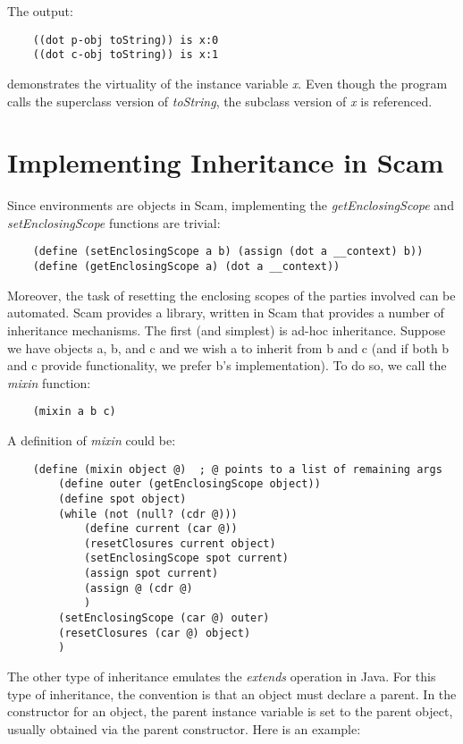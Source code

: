 The output:

\begin{verbatim}
    ((dot p-obj toString)) is x:0
    ((dot c-obj toString)) is x:1
\end{verbatim}

demonstrates the virtuality of the instance variable \emph{x}.  Even
though the program calls the superclass version of \emph{toString},
the subclass version of \emph{x} is referenced.

\section{Implementing Inheritance in Scam}

Since environments are objects in Scam, implementing the {\it
getEnclosingScope} and {\it setEnclosingScope} functions are trivial:

\begin{verbatim}
    (define (setEnclosingScope a b) (assign (dot a __context) b))
    (define (getEnclosingScope a) (dot a __context))
\end{verbatim}

Moreover, the task of resetting the enclosing scopes of the parties
involved can be automated. Scam provides a library, written in Scam that
provides a number of inheritance mechanisms. The first (and simplest)
is ad-hoc inheritance. Suppose we have objects a, b, and c and we wish
a to inherit from b and c (and if both b and c provide functionality,
we prefer b's implementation). To do so, we call the {\it mixin} function:

\begin{verbatim}
    (mixin a b c)
\end{verbatim}

A definition of {\it mixin} could be:

\begin{verbatim}
    (define (mixin object @)  ; @ points to a list of remaining args
        (define outer (getEnclosingScope object))
        (define spot object)
        (while (not (null? (cdr @)))
            (define current (car @))
            (resetClosures current object)
            (setEnclosingScope spot current)
            (assign spot current)
            (assign @ (cdr @)
            )
        (setEnclosingScope (car @) outer)
        (resetClosures (car @) object)
        )
\end{verbatim}

The other type of inheritance emulates the {\it extends} operation in
Java.  For this type of inheritance, the convention is that an object
must declare a parent. In the constructor for an object, the parent
instance variable is set to the parent object, usually obtained via the
parent constructor.  Here is an example:

